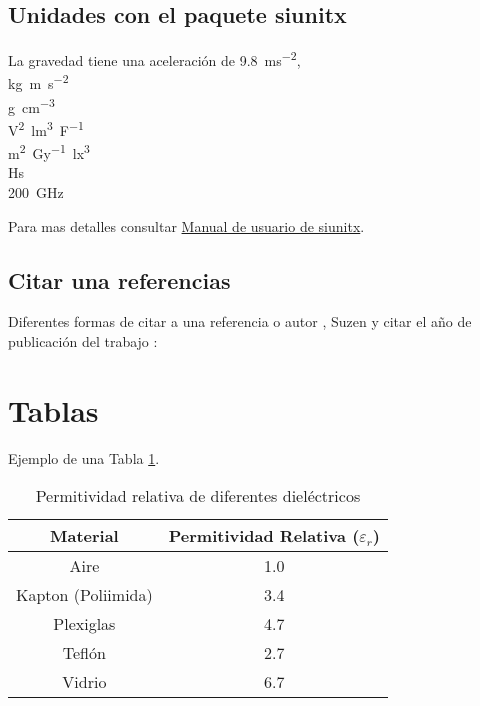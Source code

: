 \subsection{Unidades con el paquete siunitx}

La gravedad tiene una aceleración de \SI{9.8}{ms^{-2}},\\
\si{\kilo\gram\metre\per\square\second} \\
\si{\gram\per\cubic\centi\metre}\\        \si{\square\volt\cubic\lumen\per\farad}\\
\si{\metre\squared\per\gray\cubic\lux} \\ 
\si{Hs}\\
\SI{200}{GHz}

Para mas detalles consultar \href{https://ctan.mirrors.hoobly.com/macros/latex/contrib/siunitx/siunitx.pdf}{Manual de usuario de siunitx}.

\subsection{Citar una referencias}

Diferentes formas de citar a una referencia o autor \citet{abdollahzadeh2016implementation}, Suzen \cite{suzen_numerical_2005} y citar el año de publicación del trabajo \citeyear{dorr_numerical_2015}:

\section{Tablas}



Ejemplo de una Tabla \ref{tab:dielectricK}.

\begin{table}[!ht]
\centering
\caption{Permitividad relativa de diferentes dieléctricos}
\label{tab:dielectricK}
\begin{tabular}{@{}cc@{}}
\toprule
Material           & Permitividad Relativa ($\varepsilon_r$)\\ \midrule
Aire               & 1.0                   \\
Kapton (Poliimida) & 3.4                   \\
Plexiglas          & 4.7                   \\
Teflón             & 2.7                   \\
Vidrio             & 6.7                   \\ \bottomrule
\end{tabular}
\end{table}

